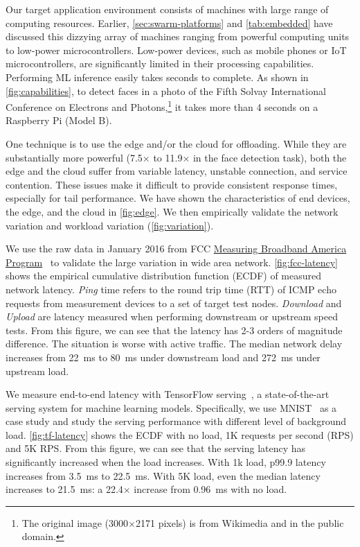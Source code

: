 Our target application environment consists of machines with large range of
computing resources. Earlier, \autoref{sec:swarm-platforms} and
\autoref{tab:embedded} have discussed this dizzying array of machines ranging
from powerful computing units to low-power microcontrollers.  Low-power devices,
such as mobile phones or IoT microcontrollers, are significantly limited in
their processing capabilities. Performing ML inference easily takes seconds to
complete. As shown in \autoref{fig:capabilities}, to detect faces in a photo of
the Fifth Solvay International Conference on Electrons and Photons,\footnote{The
  original image (3000$\times$2171 pixels) is from Wikimedia and in the public
  domain.} it takes more than 4 seconds on a Raspberry Pi (Model B).

One technique is to use the edge and/or the cloud for offloading. While they are
substantially more powerful (7.5$\times$ to 11.9$\times$ in the face detection
task), both the edge and the cloud suffer from variable latency, unstable
connection, and service contention. These issues make it difficult to provide
consistent response times, especially for tail performance. We have shown the
characteristics of end devices, the edge, and the cloud in
\autoref{fig:edge}. We then empirically validate the network variation and
workload variation (\autoref{fig:variation}).

 We use the raw data in January 2016 from FCC
\href{https://www.fcc.gov/general/measuring-broadband-america}{Measuring
  Broadband America Program}~\cite{fcc} to validate the large variation in wide
area network. \autoref{fig:fcc-latency} shows the empirical cumulative
distribution function (ECDF) of measured network latency. \textit{Ping} time refers to
the round trip time (RTT) of ICMP echo requests from measurement devices to a
set of target test nodes. \textit{Download} and \textit{Upload} are latency
measured when performing downstream or upstream speed tests. From this figure,
we can see that the latency has 2-3 orders of magnitude difference. The
situation is worse with active traffic. The median network delay increases from
\SI{22}{\ms} to \SI{80}{\ms} under downstream load and \SI{272}{\ms} under
upstream load.

 \noindent We measure end-to-end latency with
TensorFlow serving~\cite{olston2017tensorflow}, a state-of-the-art serving
system for machine learning models. Specifically, we use
MNIST~\cite{lecun1998mnist} as a case study and study the serving performance
with different level of background load. \autoref{fig:tf-latency} shows the ECDF
with no load, 1K requests per second (RPS) and 5K RPS. From this figure, we can
see that the serving latency has significantly increased when the load
increases. With 1k load, p99.9 latency increases from \SI{3.5}{\ms} to
\SI{22.5}{\ms}. With 5K load, even the median latency increases to
\SI{21.5}{\ms}: a 22.4$\times$ increase from \SI{0.96}{\ms} with no load.

